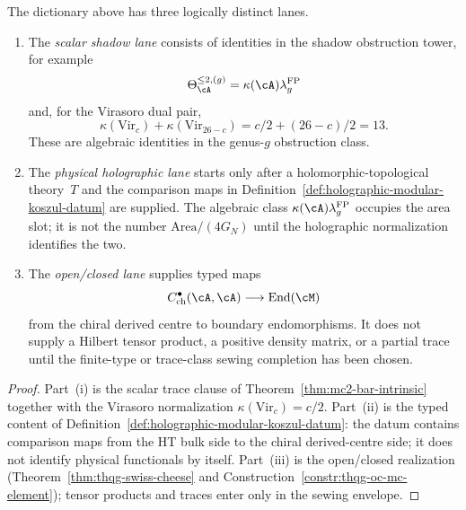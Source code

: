 \begin{proposition}
\label{prop:thqg-entanglement-lane-separation}
The dictionary above has three logically distinct lanes.
\begin{enumerate}[label=\textup{(\roman*)}]
\item The \emph{scalar shadow lane} consists of identities in the
shadow obstruction tower, for example
\[
\Theta^{\le 2,(g)}_\cA
=\kappa(\cA)\lambda_g^{\mathrm{FP}}
\]
and, for the Virasoro dual pair,
\[
\kappa(\mathrm{Vir}_c)+\kappa(\mathrm{Vir}_{26-c})
=c/2+(26-c)/2=13 .
\]
These are algebraic identities in the genus-$g$ obstruction class.

\item The \emph{physical holographic lane} starts only after a
holomorphic-topological theory~$T$ and the comparison maps in
Definition~\ref{def:holographic-modular-koszul-datum} are supplied.
The algebraic class
$\kappa(\cA)\lambda_g^{\mathrm{FP}}$ occupies the area slot; it is
not the number $\mathrm{Area}/(4G_N)$ until the holographic
normalization identifies the two.

\item The \emph{open/closed lane} supplies typed maps
\[
C^\bullet_{\mathrm{ch}}(\cA,\cA)
\longrightarrow
\operatorname{End}(\cM)
\]
from the chiral derived centre to boundary endomorphisms.  It does
not supply a Hilbert tensor product, a positive density matrix, or a
partial trace until the finite-type or trace-class sewing completion
has been chosen.
\end{enumerate}
\end{proposition}

\begin{proof}
Part~\textup{(i)} is the scalar trace clause of
Theorem~\ref{thm:mc2-bar-intrinsic} together with the Virasoro
normalization $\kappa(\mathrm{Vir}_c)=c/2$.  Part~\textup{(ii)} is
the typed content of Definition~\ref{def:holographic-modular-koszul-datum}:
the datum contains comparison maps from the HT bulk side to the
chiral derived-centre side; it does not identify physical
functionals by itself.  Part~\textup{(iii)} is the open/closed realization
(Theorem~\ref{thm:thqg-swiss-cheese} and
Construction~\ref{constr:thqg-oc-mc-element}); tensor products and
traces enter only in the sewing envelope.
\end{proof}


